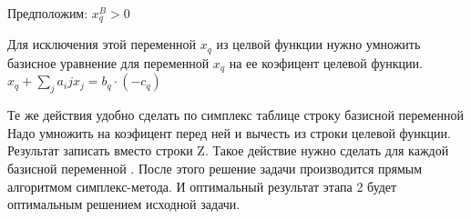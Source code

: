 Предположим: $x^B_q > 0$

Для исключения этой переменной $x_q$ из целвой функции нужно умножить базисное уравнение для переменной  $x_q$ на ее коэфицент целевой функции.\\
$x_q + \sum\limits_{j}{a_ij x_j} = b_q \cdot (-c_q)$

Те же действия удобно сделать по симплекс таблице
строку базисной переменной Надо умножить на коэфицент перед ней и вычесть из строки целевой функции. Результат записать вместо строки Z.
Такое действие нужно сделать для каждой базисной переменной .
После этого решение задачи производится прямым алгоритмом симплекс-метода.
И оптимальный результат этапа 2 будет оптимальным решением исходной задачи.


